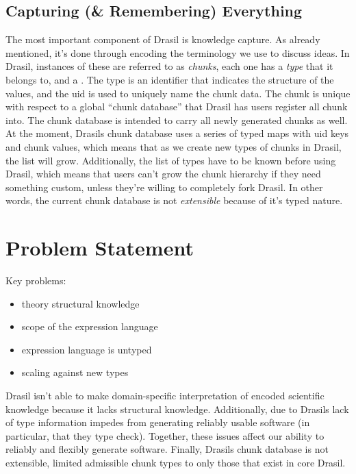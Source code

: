 \subsection{Capturing (\& Remembering) Everything}

The most important component of Drasil is knowledge capture. As already
mentioned, it's done through encoding the terminology we use to discuss ideas.
In Drasil, instances of these are referred to as \textit{chunks}, each one has a
\textit{type} that it belongs to, and a . The type is an identifier
that indicates the structure of the values, and the \acs{uid} is used to
uniquely name the chunk data. The chunk is unique with respect to a global
``chunk database'' that Drasil has users register all chunk into. The chunk
database is intended to carry all newly generated chunks as well. At the moment,
Drasils chunk database uses a series of typed maps with \acs{uid} keys and chunk
values, which means that as we create new types of chunks in Drasil, the list
will grow. Additionally, the list of types have to be known before using Drasil,
which means that users can't grow the chunk hierarchy if they need something
custom, unless they're willing to completely fork Drasil. In other words, the
current chunk database is not \textit{extensible} because of it's typed nature.

\section{Problem Statement}
\label{sec:intro:problemStatement}

\begin{writingdirectives}
      \item Key problems:
      \begin{itemize}
            \item theory structural knowledge
            \item scope of the expression language
            \item expression language is untyped
            \item scaling against new types
      \end{itemize}
\end{writingdirectives}

Drasil isn't able to make domain-specific interpretation of encoded scientific
knowledge because it lacks structural knowledge. Additionally, due to Drasils
lack of type information impedes from generating reliably usable software (in
particular, that they type check). Together, these issues affect our ability to
reliably and flexibly generate software. Finally, Drasils chunk database is not
extensible, limited admissible chunk types to only those that exist in core
Drasil.

